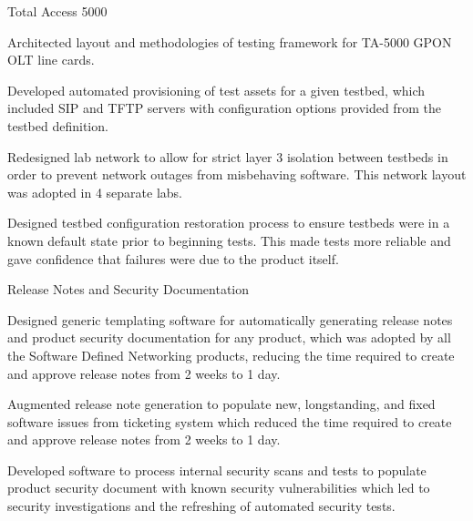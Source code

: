 \begin{cventries}
  \cventry
    {
} {Total Access 5000} {} {} {
      \begin{cvitems}
        \item {Architected layout and methodologies of testing framework for TA-5000 GPON OLT line cards.}
        \item {Developed automated provisioning of test assets for a given testbed, which included SIP and TFTP servers with configuration options provided from the testbed definition.}
        \item {Redesigned lab network to allow for strict layer 3 isolation between testbeds in order to prevent network outages from misbehaving software. This network layout was adopted in 4 separate labs.}
        \item {Designed testbed configuration restoration process to ensure testbeds were in a known default state prior to beginning tests. This made tests more reliable and gave confidence that failures were due to the product itself.}
      \end{cvitems}
    }


  \cventry
    {
} {Release Notes and Security Documentation} {} {} {
      \begin{cvitems}
        \item {Designed generic templating software for automatically generating release notes and product security documentation for any product, which was adopted by all the Software Defined Networking products, reducing the time required to create and approve release notes from 2 weeks to 1 day.}
        \item {Augmented release note generation to populate new, longstanding, and fixed software issues from ticketing system which reduced the time required to create and approve release notes from 2 weeks to 1 day.}
        \item {Developed software to process internal security scans and tests to populate product security document with known security vulnerabilities which led to security investigations and the refreshing of automated security tests.}
      \end{cvitems}
    }


\end{cventries}
